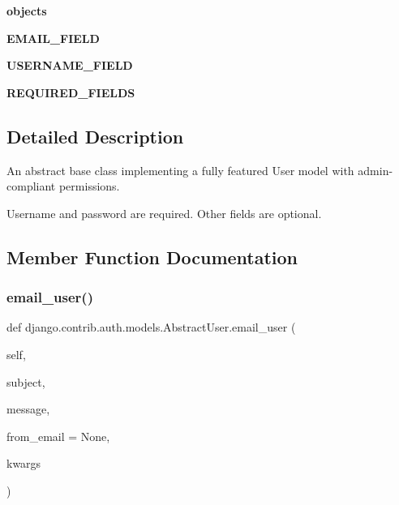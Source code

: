 \begin{DoxyCompactItemize}
{\bfseries objects}
\item 
\mbox{\label{classdjango_1_1contrib_1_1auth_1_1models_1_1_abstract_user_a7da7021bfd1ea0276ecb41b8bd3ab676}} 
{\bfseries E\+M\+A\+I\+L\+\_\+\+F\+I\+E\+LD}
\item 
\mbox{\label{classdjango_1_1contrib_1_1auth_1_1models_1_1_abstract_user_a18ff093ead0e07afc433b3020fb4588a}} 
{\bfseries U\+S\+E\+R\+N\+A\+M\+E\+\_\+\+F\+I\+E\+LD}
\item 
\mbox{\label{classdjango_1_1contrib_1_1auth_1_1models_1_1_abstract_user_afc471f40a715af8ea95bf144ba9f0004}} 
{\bfseries R\+E\+Q\+U\+I\+R\+E\+D\+\_\+\+F\+I\+E\+L\+DS}
\end{DoxyCompactItemize}


\subsection{Detailed Description}
\begin{DoxyVerb}An abstract base class implementing a fully featured User model with
admin-compliant permissions.

Username and password are required. Other fields are optional.
\end{DoxyVerb}
 

\subsection{Member Function Documentation}
\mbox{\label{classdjango_1_1contrib_1_1auth_1_1models_1_1_abstract_user_ae08682055407fa8fc7de3cdc734097cd}} 
\subsubsection{\texorpdfstring{email\+\_\+user()}{email\_user()}}
{\footnotesize\ttfamily def django.\+contrib.\+auth.\+models.\+Abstract\+User.\+email\+\_\+user (\begin{DoxyParamCaption}\item[{}]{self,  }\item[{}]{subject,  }\item[{}]{message,  }\item[{}]{from\+\_\+email = {\ttfamily None},  }\item[{}]{kwargs }\end{DoxyParamCaption})}


